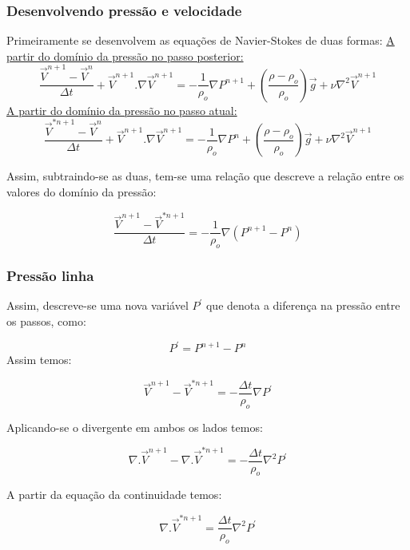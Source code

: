 \documentclass[xcolor=dvipsnames,10pt,aspectratio=169]{beamer}
\begin{document}
	
	\begin{frame}
		\frametitle{Desenvolvendo pressão e velocidade}
		\flushleft
		Primeiramente se desenvolvem as equações de Navier-Stokes de duas formas:\vspace{0.5cm}
		\centering
		\underline{A partir do domínio da pressão no passo posterior:}
		\begin{equation}
		\frac{\vec{V}^{n + 1} - \vec{V}^{n}}{\Delta t} + \vec{V}^{n + 1} . {\nabla} \vec{V}^{n + 1} = - \frac{1}{\rho_o}\nabla P^{n+1} + \left( \frac{\rho - \rho_o}{\rho_o} \right) \vec{g} + \nu \nabla^2 \vec{V}^{n+1}
		\end{equation}
		\underline{A partir do domínio da pressão no passo atual:}
		\begin{equation}
		\frac{\vec{V}^{\ast{n + 1}} - \vec{V}^{n}}{\Delta t} + \vec{V}^{n + 1} . {\nabla} \vec{V}^{n + 1} = - \frac{1}{\rho_o}\nabla P^{n} + \left( \frac{\rho - \rho_o}{\rho_o} \right) \vec{g} + \nu \nabla^2 \vec{V}^{n+1}
		\end{equation}
		
		Assim, subtraindo-se as duas, tem-se uma relação que descreve a relação entre os valores do domínio da pressão:
		
		\begin{equation}
		\frac{\vec{V}^{{n + 1}} - \vec{V}^{{\ast n+1} }}{\Delta t} = - \frac{1}{\rho_o}\nabla \left( P^{n+1} - P ^n\right)
		\end{equation}
		
		
		
	\end{frame}




	\begin{frame}
		\frametitle{Pressão linha}
		\flushleft
		Assim, descreve-se uma nova variável $ P^\prime $ que denota a diferença na pressão entre os passos, como:
		
		\begin{equation}
		P^\prime = P^{n + 1} - P^n
		\end{equation}
		Assim temos:
		
		\begin{equation}
		\vec{V}^{n+1} - \vec{V}^{\ast{n + 1}} = - \frac{\Delta t}{\rho_o} \nabla P^\prime
		\end{equation}
		
		Aplicando-se o divergente em ambos os lados temos:
		
		\begin{equation}
		\nabla . \vec{V}^{n+1} - \nabla .\vec{V}^{\ast{n + 1}} = - \frac{\Delta t}{\rho_o} \nabla^2 P^\prime
		\end{equation}
		
		A partir da equação da continuidade temos:
		
		\begin{equation}
		\nabla .\vec{V}^{\ast{n + 1}} = \frac{\Delta t}{\rho_o} \nabla^2 P^\prime
		\end{equation}
		
	
	\end{frame}
\end{document}

